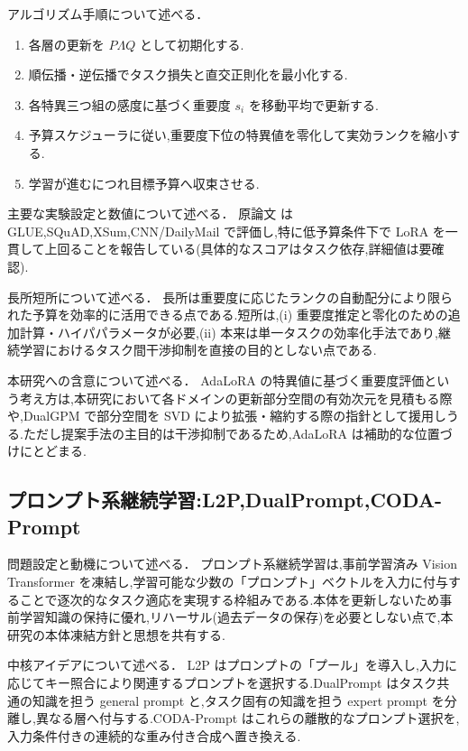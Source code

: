 アルゴリズム手順について述べる．
\begin{enumerate}
\item 各層の更新を $P \Lambda Q$ として初期化する.
\item 順伝播・逆伝播でタスク損失と直交正則化を最小化する.
\item 各特異三つ組の感度に基づく重要度 $s_i$ を移動平均で更新する.
\item 予算スケジューラに従い,重要度下位の特異値を零化して実効ランクを縮小する.
\item 学習が進むにつれ目標予算へ収束させる.
\end{enumerate}

主要な実験設定と数値について述べる．
原論文 \cite{adalora} は GLUE,SQuAD,XSum,CNN/DailyMail で評価し,特に低予算条件下で LoRA を一貫して上回ることを報告している(具体的なスコアはタスク依存,詳細値は要確認).

長所短所について述べる．
長所は重要度に応じたランクの自動配分により限られた予算を効率的に活用できる点である.短所は,(i) 重要度推定と零化のための追加計算・ハイパパラメータが必要,(ii) 本来は単一タスクの効率化手法であり,継続学習におけるタスク間干渉抑制を直接の目的としない点である.

本研究への含意について述べる．
AdaLoRA の特異値に基づく重要度評価という考え方は,本研究において各ドメインの更新部分空間の有効次元を見積もる際や,DualGPM \cite{inflora} で部分空間を SVD により拡張・縮約する際の指針として援用しうる.ただし提案手法の主目的は干渉抑制であるため,AdaLoRA は補助的な位置づけにとどまる.

\subsection{プロンプト系継続学習:L2P,DualPrompt,CODA-Prompt}

問題設定と動機について述べる．
プロンプト系継続学習は,事前学習済み Vision Transformer を凍結し,学習可能な少数の「プロンプト」ベクトルを入力に付与することで逐次的なタスク適応を実現する枠組みである.本体を更新しないため事前学習知識の保持に優れ,リハーサル(過去データの保存)を必要としない点で,本研究の本体凍結方針と思想を共有する.

中核アイデアについて述べる．
L2P \cite{ltp} はプロンプトの「プール」を導入し,入力に応じてキー照合により関連するプロンプトを選択する.DualPrompt \cite{dualprompt} はタスク共通の知識を担う general prompt と,タスク固有の知識を担う expert prompt を分離し,異なる層へ付与する.CODA-Prompt \cite{codaprompt} はこれらの離散的なプロンプト選択を,入力条件付きの連続的な重み付き合成へ置き換える.

